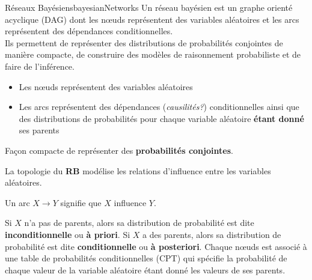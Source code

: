 \begin{definition}{Réseaux Bayésiens}{bayesianNetworks}
    Un réseau bayésien est un graphe orienté acyclique (DAG) dont les nœuds représentent des variables aléatoires et les arcs représentent des dépendances conditionnelles.\\
    Ils permettent de représenter des distributions de probabilités conjointes de manière compacte, de construire des modèles de raisonnement probabiliste et de faire de l'inférence.
    \begin{itemize}
        \item Les nœuds représentent des variables aléatoires
        \item Les arcs représentent des dépendances (\textit{causilités?}) conditionnelles ainsi que des distributions de probabilités pour chaque variable aléatoire \textbf{étant donné} ses parents
    \end{itemize}
    Façon compacte de représenter des \textbf{probabilités conjointes}.
    
\end{definition}


La topologie du \textbf{RB} modélise les relations d'influence entre les variables aléatoires. 

Un arc $X \rightarrow Y$ signifie que $X$ influence $Y$.

Si $X$ n'a pas de parents, alors sa distribution de probabilité est dite \textbf{inconditionnelle} ou \textbf{à priori}.
Si $X$ a des parents, alors sa distribution de probabilité est dite \textbf{conditionnelle} ou \textbf{à posteriori}.
Chaque nœuds est associé à une table de probabilités conditionnelles (CPT) qui spécifie la probabilité de chaque valeur de la variable aléatoire étant donné les valeurs de ses parents. 




